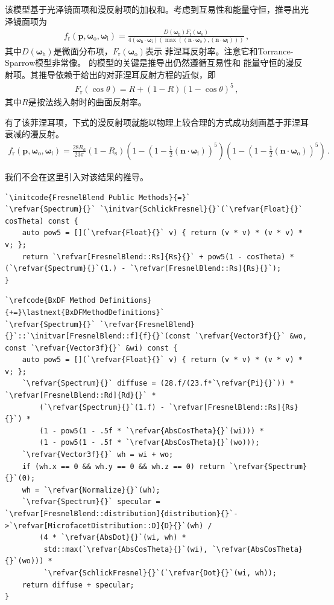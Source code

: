 该模型基于光泽镜面项和漫反射项的加权和。考虑到互易性和能量守恒，推导出光泽镜面项为
\begin{align*}
    f_{\mathrm{r}}({\bm p},{\bm\omega}_{\mathrm{o}},{\bm\omega}_{\mathrm{i}})
    =\frac{D({\bm\omega}_{\mathrm{h}})F_{\mathrm{r}}({\bm\omega}_{\mathrm{o}})}
    {4({\bm\omega}_{\mathrm{h}}\cdot{\bm\omega}_{\mathrm{i}})
    (\max(({\bm n}\cdot{\bm\omega}_{\mathrm{o}}),({\bm n}\cdot{\bm\omega}_{\mathrm{i}})))}\, ,
\end{align*}
其中$D({\bm\omega}_{\mathrm{h}})$是微面分布项，$F_{\mathrm{r}}({\bm\omega}_{\mathrm{o}})$表示
菲涅耳反射率。注意它和Torrance-Sparrow模型非常像。
\citeauthor{AshikhminPhong}的模型的关键是推导出仍然遵循互易性和
能量守恒的漫反射项。其推导依赖于\citet{Schlick1993}给出的对菲涅耳反射方程的近似，即
\begin{align*}
    F_{\mathrm{r}}(\cos\theta)=R+(1-R)(1-\cos\theta)^5\, ,
\end{align*}
其中$R$是按法线入射时的曲面反射率。

有了该菲涅耳项，下式的漫反射项就能以物理上较合理的方式成功刻画基于菲涅耳衰减的漫反射。
\begin{align*}
    f_{\mathrm{r}}({\bm p},{\bm\omega}_{\mathrm{o}},{\bm\omega}_{\mathrm{i}})
    =\frac{28R_{\mathrm{d}}}{23\pi}(1-R_{\mathrm{s}})
    \left(1-\left(1-\frac{1}{2}({\bm n}\cdot{\bm\omega}_{\mathrm{i}})\right)^5\right)
    \left(1-\left(1-\frac{1}{2}({\bm n}\cdot{\bm\omega}_{\mathrm{o}})\right)^5\right)\, .
\end{align*}

我们不会在这里引入对该结果的推导。
\begin{lstlisting}
`\initcode{FresnelBlend Public Methods}{=}`
`\refvar{Spectrum}{}` `\initvar{SchlickFresnel}{}`(`\refvar{Float}{}` cosTheta) const {
    auto pow5 = [](`\refvar{Float}{}` v) { return (v * v) * (v * v) * v; };
    return `\refvar[FresnelBlend::Rs]{Rs}{}` + pow5(1 - cosTheta) * (`\refvar{Spectrum}{}`(1.) - `\refvar[FresnelBlend::Rs]{Rs}{}`);
}
\end{lstlisting}
\begin{lstlisting}
`\refcode{BxDF Method Definitions}{+=}\lastnext{BxDFMethodDefinitions}`
`\refvar{Spectrum}{}` `\refvar{FresnelBlend}{}`::`\initvar[FresnelBlend::f]{f}{}`(const `\refvar{Vector3f}{}` &wo, const `\refvar{Vector3f}{}` &wi) const {
    auto pow5 = [](`\refvar{Float}{}` v) { return (v * v) * (v * v) * v; };
    `\refvar{Spectrum}{}` diffuse = (28.f/(23.f*`\refvar{Pi}{}`)) * `\refvar[FresnelBlend::Rd]{Rd}{}` *
        (`\refvar{Spectrum}{}`(1.f) - `\refvar[FresnelBlend::Rs]{Rs}{}`) * 
        (1 - pow5(1 - .5f * `\refvar{AbsCosTheta}{}`(wi))) *
        (1 - pow5(1 - .5f * `\refvar{AbsCosTheta}{}`(wo)));
    `\refvar{Vector3f}{}` wh = wi + wo;
    if (wh.x == 0 && wh.y == 0 && wh.z == 0) return `\refvar{Spectrum}{}`(0);
    wh = `\refvar{Normalize}{}`(wh);
    `\refvar{Spectrum}{}` specular = `\refvar[FresnelBlend::distribution]{distribution}{}`->`\refvar[MicrofacetDistribution::D]{D}{}`(wh) /
        (4 * `\refvar{AbsDot}{}`(wi, wh) *
         std::max(`\refvar{AbsCosTheta}{}`(wi), `\refvar{AbsCosTheta}{}`(wo))) *
         `\refvar{SchlickFresnel}{}`(`\refvar{Dot}{}`(wi, wh));
    return diffuse + specular;
}
\end{lstlisting}
